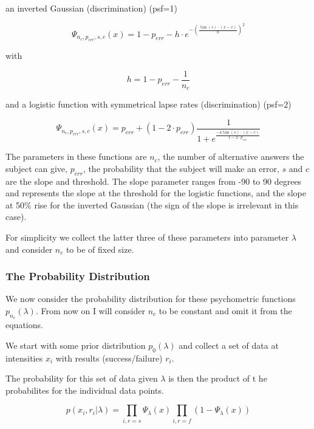 \documentclass[10pt,letterpaper]{article}
\begin{document}
an inverted Gaussian (discrimination) (psf=1)

\begin{equation}
\Psi_{n_c,p_{err},s,c}(x) = 1 - p_{err} - h \cdot e^{ - \left( \frac{\tan(s) \cdot (x-c)}{h} \right) ^2}
\end{equation}

with 

\begin{equation}
h = 1 - p_{err} - \frac{1}{n_c}
\end{equation}

and a logistic function with symmetrical lapse rates (discrimination) (psf=2)

\begin{equation}
\Psi_{n_c,p_{err},s,c}(x) = p_{err} + (1 - 2 \cdot p_{err}) \frac{1}{ 1+e^{ \frac{- 4 \tan(s) \cdot (x-c)}{1 - 2 \cdot p_{err} } } }
\end{equation}


The parameters in these functions are $n_c$, the number of alternative 
answers the subject can give, $p_{err}$, the probability that the subject will 
make an error, $s$ and $c$ are the slope and threshold. The slope parameter ranges 
from -90 to 90 degrees and represents the slope at the threshold for the logistic
functions, and the slope at 50\% rise for the inverted Gaussian (the sign of the slope
is irrelevant in this case).

For simplicity we collect the latter three of these parameters into parameter 
$\lambda$ and consider $n_c$ to be of fixed size.

\subsubsection{The Probability Distribution}

We now consider the probability distribution for these psychometric functions
$p_{n_c}(\lambda)$. From now on I will consider $n_c$ to be constant and omit it
from the equations.

We start with some prior distribution $p_0(\lambda)$ and collect a set of data 
at intensities $x_i$ with results (success/failure) $r_i$.

The probability for this set of data given $\lambda$ is then the product of t he 
probabilites for the individual data points.

\begin{equation}
p(x_i,r_i|\lambda) = \prod_{i,r=s} \Psi_\lambda (x) \prod_{i,r=f} (1-\Psi_\lambda (x)) 
\end{equation}
\end{document}
